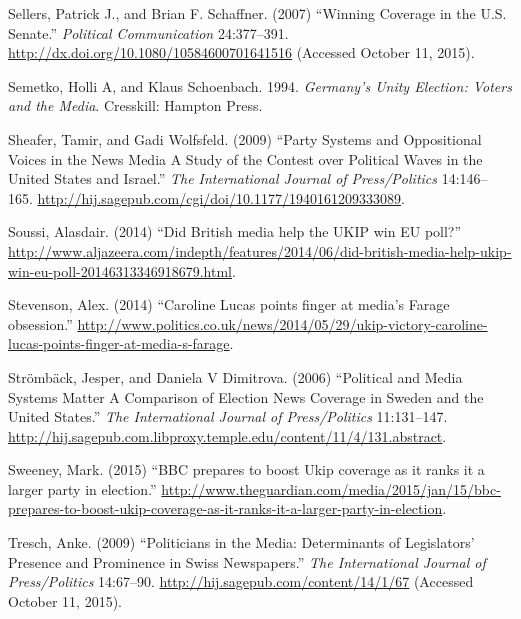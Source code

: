 \documentclass[12pt,article]{article}
\begin{document}
Sellers, Patrick J., and Brian F. Schaffner. (2007) ``Winning Coverage
in the U.S. Senate.'' \emph{Political Communication} 24:377--391.
\url{http://dx.doi.org/10.1080/10584600701641516} (Accessed October 11,
2015).

Semetko, Holli A, and Klaus Schoenbach. 1994. \emph{Germany's Unity
Election: Voters and the Media}. Cresskill: Hampton Press.

Sheafer, Tamir, and Gadi Wolfsfeld. (2009) ``Party Systems and
Oppositional Voices in the News Media A Study of the Contest over
Political Waves in the United States and Israel.'' \emph{The
International Journal of Press/Politics} 14:146--165.
\url{http://hij.sagepub.com/cgi/doi/10.1177/1940161209333089}.

Soussi, Alasdair. (2014) ``Did British media help the UKIP win EU
poll?''
\url{http://www.aljazeera.com/indepth/features/2014/06/did-british-media-help-ukip-win-eu-poll-20146313346918679.html}.

Stevenson, Alex. (2014) ``Caroline Lucas points finger at media's Farage
obsession.''
\url{http://www.politics.co.uk/news/2014/05/29/ukip-victory-caroline-lucas-points-finger-at-media-s-farage}.

Strömbäck, Jesper, and Daniela V Dimitrova. (2006) ``Political and Media
Systems Matter A Comparison of Election News Coverage in Sweden and the
United States.'' \emph{The International Journal of Press/Politics}
11:131--147.
\url{http://hij.sagepub.com.libproxy.temple.edu/content/11/4/131.abstract}.

Sweeney, Mark. (2015) ``BBC prepares to boost Ukip coverage as it ranks
it a larger party in election.''
\url{http://www.theguardian.com/media/2015/jan/15/bbc-prepares-to-boost-ukip-coverage-as-it-ranks-it-a-larger-party-in-election}.

Tresch, Anke. (2009) ``Politicians in the Media: Determinants of
Legislators' Presence and Prominence in Swiss Newspapers.'' \emph{The
International Journal of Press/Politics} 14:67--90.
\url{http://hij.sagepub.com/content/14/1/67} (Accessed October 11,
2015).
\end{document}
